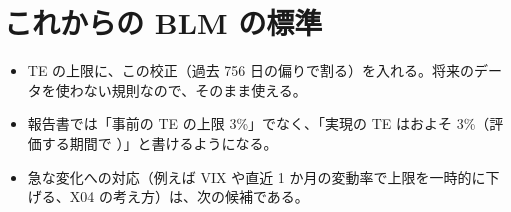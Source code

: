 \section{これからの BLM の標準}

\begin{itemize}
\item TE の上限に、この校正（過去 756 日の偏りで割る）を入れる。将来のデータを使わない規則なので、そのまま使える。
\item 報告書では「事前の TE の上限 3\%」でなく、「実現の TE はおよそ 3\%（評価する期間で ）」と書けるようになる。
\item 急な変化への対応（例えば VIX や直近 1 か月の変動率で上限を一時的に下げる、X04 の考え方）は、次の候補である。
\end{itemize}
